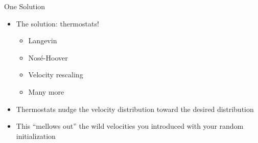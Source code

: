 \documentclass{beamer}
\begin{document}
	
	\begin{frame}{One Solution}
	\begin{itemize}
	\item The solution: thermostats!\vspace{0.5em}
	\begin{itemize}
	\item Langevin\vspace{0.5em}
	\item Nos\'e-Hoover\vspace{0.5em}
	\item Velocity rescaling \vspace{0.5em}
	\item Many more\vspace{0.5em}
	\end{itemize}
	\item Thermostats nudge the velocity distribution toward the desired distribution\vspace{0.5em}
	\item This ``mellows out'' the wild velocities you introduced with your random initialization
	\end{itemize}
	\end{frame}
	
\end{document}
